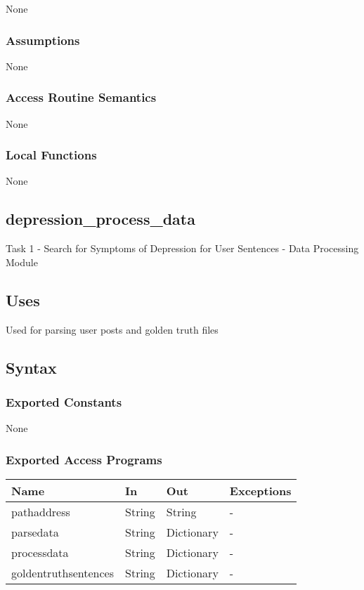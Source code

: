 \documentclass[12pt, titlepage]{article}
\begin{document}
None

\subsubsection{Assumptions}

None


\subsubsection{Access Routine Semantics}

None


\subsubsection{Local Functions}

None

\subsection{depression\_process\_data}

Task 1 - Search for Symptoms of Depression for User Sentences - Data Processing Module

\subsection{Uses}

Used for parsing user posts and golden truth files

\subsection{Syntax}

\subsubsection{Exported Constants}

None

\subsubsection{Exported Access Programs}

\begin{center}
\begin{tabular}{p{3.5cm} p{4.5cm} p{3cm} p{2cm}}
\hline
\textbf{Name} & \textbf{In} & \textbf{Out} & \textbf{Exceptions} \\
\hline
pathaddress & String & String & - \\
parsedata & String & Dictionary & - \\
processdata & String & Dictionary  & - \\
goldentruthsentences & String & Dictionary & - \\
\hline
\end{tabular}
\end{center}
\end{document}
